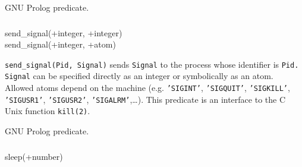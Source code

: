 \Portability

GNU Prolog predicate.

\subsubsection{}

\begin{TemplatesOneCol}
send\_signal(+integer, +integer)\\
send\_signal(+integer, +atom)

\end{TemplatesOneCol}

\Description

\texttt{send\_signal(Pid, Signal)} sends \texttt{Signal} to the process whose
identifier is \texttt{Pid.} \texttt{Signal} can be specified directly as an
integer or symbolically as an atom. Allowed atoms depend on the machine (e.g.
\texttt{'SIGINT'}, \texttt{'SIGQUIT'}, \texttt{'SIGKILL'},
\texttt{'SIGUSR1'}, \texttt{'SIGUSR2'}, \texttt{'SIGALRM'},\ldots). This
predicate is an interface to the C Unix function \texttt{kill(2)}.

\begin{PlErrors}






\end{PlErrors}

\Portability

GNU Prolog predicate.

\subsubsection{}

\begin{TemplatesOneCol}
sleep(+number)

\end{TemplatesOneCol}

